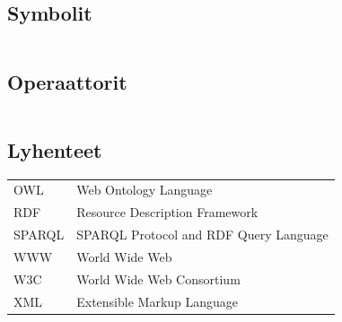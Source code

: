 \documentclass[finnish, 12pt, a4paper, elec, utf8, pdfa, online]{aaltothesis}
\begin{document}
\newpage


\thesistableofcontents



\subsection*{Symbolit}

\begin{tabular}{ll}
\end{tabular}

\subsection*{Operaattorit}

\begin{tabular}{ll}
\end{tabular}

\subsection*{Lyhenteet}
\begin{tabular}{ll}
OWL          & Web Ontology Language \\
RDF          & Resource Description Framework \\
SPARQL       & SPARQL Protocol and RDF Query Language \\
WWW          & World Wide Web \\
W3C          & World Wide Web Consortium \\
XML          & Extensible Markup Language \\
\end{tabular}


\cleardoublepage

\end{document}
